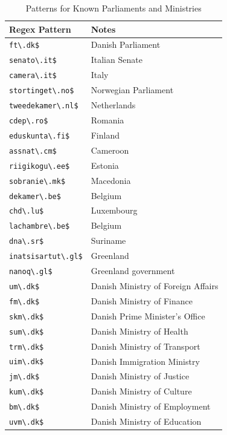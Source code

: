 \documentclass[12pt, letterpaper]{article}
\begin{document}
\begin{table}[ht]
\centering
\tiny
\setlength\tabcolsep{4 pt}
\caption{Patterns for Known Parliaments and Ministries}
\label{tab:regex_known_parliaments_ministries}
\begin{tabular}{@{\hspace{0\tabcolsep}}ll@{\hspace{0\tabcolsep}}}
\toprule
\textbf{Regex Pattern} & \textbf{Notes} \\
\midrule
\verb|ft\.dk$| & Danish Parliament \\
\verb|senato\.it$| & Italian Senate \\
\verb|camera\.it$| & Italy \\
\verb|stortinget\.no$| & Norwegian Parliament \\
\verb|tweedekamer\.nl$| & Netherlands \\
\verb|cdep\.ro$| & Romania \\
\verb|eduskunta\.fi$| & Finland \\
\verb|assnat\.cm$| & Cameroon \\
\verb|riigikogu\.ee$| & Estonia \\
\verb|sobranie\.mk$| & Macedonia \\
\verb|dekamer\.be$| & Belgium \\
\verb|chd\.lu$| & Luxembourg \\
\verb|lachambre\.be$| & Belgium \\
\verb|dna\.sr$| & Suriname \\
\verb|inatsisartut\.gl$| & Greenland \\
\verb|nanoq\.gl$| & Greenland government \\
\verb|um\.dk$| & Danish Ministry of Foreign Affairs \\
\verb|fm\.dk$| & Danish Ministry of Finance \\
\verb|skm\.dk$| & Danish Prime Minister's Office \\
\verb|sum\.dk$| & Danish Ministry of Health \\
\verb|trm\.dk$| & Danish Ministry of Transport \\
\verb|uim\.dk$| & Danish Immigration Ministry \\
\verb|jm\.dk$| & Danish Ministry of Justice \\
\verb|kum\.dk$| & Danish Ministry of Culture \\
\verb|bm\.dk$| & Danish Ministry of Employment \\
\verb|uvm\.dk$| & Danish Ministry of Education \\

\end{tabular}
\end{table}
\end{document}
